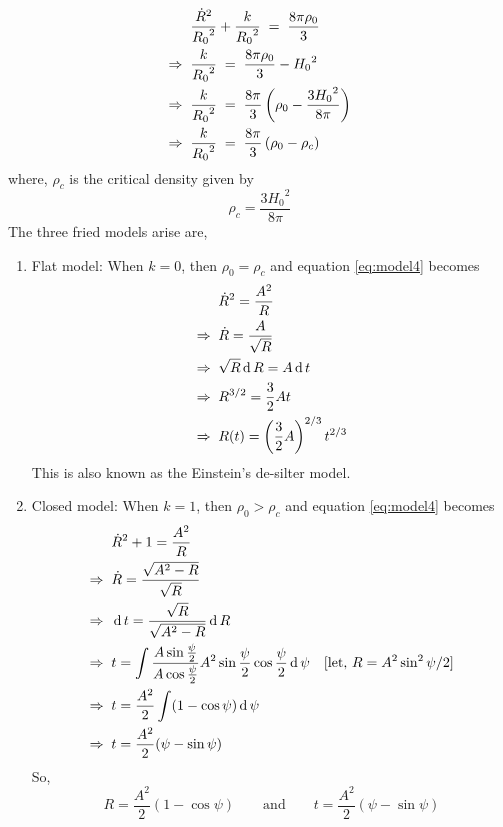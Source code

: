 \documentclass[../main-sheet.tex]{subfiles}
\begin{document}
\begin{soln}
\begin{align}
    &\frac{\dot{R}^2}{{R_0}^2}+\frac{k}{{R_0}^2}\;=\;\frac{8\pi\rho_0 }{3}\notag\\
    \Rightarrow\;\;& \frac{k}{{R_0}^2}\;=\;\frac{8\pi\rho_0 }{3}-{H_0}^2\notag\\
    \Rightarrow\;\;& \frac{k}{{R_0}^2}\;=\;\frac{8\pi}{3}\left( \rho_0-\frac{3{H_0}^2}{8\pi} \right)\notag\\
    \Rightarrow\;\;& \frac{k}{{R_0}^2}\;=\;\frac{8\pi}{3}\left( \rho_0-\rho_c \right)\label{eq:model6}
\end{align}
where, \(\rho_c\) is the critical density given by
\begin{equation}
    \rho_c=\frac{3{H_0}^2}{8\pi}\label{eq:model7}
\end{equation}
The three fried models arise are,
\begin{enumerate}[label=(\roman*)]
    \item Flat model: When \(k = 0\), then \(\rho_0=\rho_c\) and equation \eqref{eq:model4} becomes
    \begin{align*}
        &\dot{R}^2=\frac{A^2}{R }\\
        \Rightarrow\;\;&\dot{R}=\frac{A}{\sqrt{R} }\\
        \Rightarrow\;\;&\sqrt{R} \,\mathrm{d}\, R=A\,\mathrm{d}\, t \\
        \Rightarrow\;\;&{R}^{3/2} =\frac{3}{2}A t \\
        \Rightarrow\;\;&{R}(t)=\left(\frac{3}{2}A\right)^{2/3} t^{2/3}
    \end{align*}
    This is also known as the Einstein's de-silter model.
    \item Closed model: When \(k = 1\), then \(\rho_0>\rho_c\) and equation \eqref{eq:model4} becomes
    \begin{align*}
        &\dot{R}^2+1=\frac{A^2}{R }\\
        \Rightarrow\;\;&\dot{R}=\frac{\sqrt{A^2-R}}{\sqrt{R} }\\
        \Rightarrow\;\;&\,\mathrm{d}\, t=\frac{\sqrt{R} }{\sqrt{A^2-R}}\,\mathrm{d}\, R \\
        \Rightarrow\;\;&t=\int \frac{A \sin \frac{\psi}{2}}{A \cos \frac{\psi}{2}}A^2\sin \frac{\psi}{2}\cos\frac{\psi}{2} \,\mathrm{d}\, \psi\quad[\text{let, }R=A^2\sin^2\psi/2]\\
        \Rightarrow\;\;&t=\frac{A^2}{2}\int (1- \cos \psi)\,\mathrm{d}\, \psi\\
        \Rightarrow\;\;&t=\frac{A^2}{2}(\psi- \sin \psi)
    \end{align*}
    So,
    \[R=\frac{A^2}{2}(1- \cos \psi)\qquad\text{and}\qquad t=\frac{A^2}{2}(\psi- \sin \psi)\]

\end{enumerate}
\end{soln}
\end{document}
